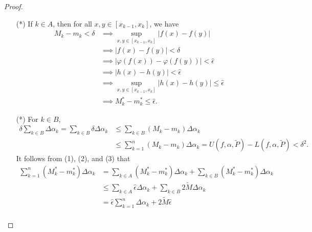 \begin{proof}
    \begin{enumerate}
        \item[(*)] If \( k \in A \), then for all \( x,y \in [{x}_{k-1}, {x}_{k}] \), we have
            \begin{align*}
                {M}_{k } - {m}_{k } < \delta &\implies \sup_{x,y \in [{x}_{k-1}, {x}_{k}]} | f(x) - f(y) |  \\
                                             &\implies | f(x) - f(y) |  < \delta \\
                                             &\implies | \varphi(f(x)) - \varphi(f(y)) |  < \hat{\epsilon} \\
                                             &\implies | h(x) - h(y) | < \hat{\epsilon} \\
                                             &\implies \sup_{x,y \in [{x}_{k-1}, {x}_{k}]} | h(x) - h(y) |  \leq \hat{\epsilon} \\
                                             &\implies {M}_{k }^{*} - {m}_{k }^{*} \leq \hat{\epsilon}. \tag{2}
            \end{align*}
        \item[(*)] For \( k \in B \), 
            \begin{align*}
                \delta \sum_{k \in B} \Delta {\alpha}_{k } = \sum_{k \in B} \delta \Delta {\alpha}_{k } &\leq \sum_{k \in B} ({M}_{k } - {m}_{k}) \Delta {\alpha}_{k } \\ 
                                                                                                        &\leq \sum_{ k=1  }^{ n }({M}_{k } -{m}_{k }) \Delta {\alpha}_{k } = U(f,\alpha, \tilde{P}) -  L(f,\alpha, \tilde{P}) < \delta^{2}. \tag{3}
            \end{align*}
            It follows from (1), (2), and (3) that 
            \begin{align*}
                \sum_{ k=1  }^{ n } ({M}_{k }^{*} - {m}_{k }^{*}) \Delta {\alpha}_{k } &= \sum_{k \in A} ({M}_{k }^{*} - {m}_{k }^{*}) \Delta {\alpha}_{k } + \sum_{k \in B} ({M}_{k }^{*} -{m}_{k }^{*}) \Delta {\alpha}_{k } \\
                                                                                       &\leq \sum_{k \in A} \hat{\epsilon} \Delta {\alpha}_{k } + \sum_{k \in B} 2 \tilde{M} \Delta {\alpha}_{k } \\
                                                                                       &= \hat{\epsilon} \sum_{ k=1  }^{ n } \Delta {\alpha}_{k } + 2 \tilde{M} \hat{\epsilon} \\

\end{align*}
\end{enumerate}
\end{proof}
